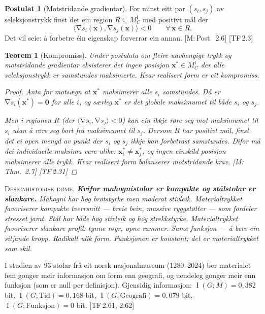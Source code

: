 \documentclass[10pt]{book}
\theoremstyle{definition}
\newtheorem{postulat}[definisjon]{Postulat}
\theoremstyle{plain}
\newtheorem{teorem}[definisjon]{Teorem}
\theoremstyle{remark}
\newenvironment{designhistorie}%
  {\medskip\noindent\textsc{Designhistorisk d\o me.}\itshape\enspace}%
  {\medskip}
\newcommand{\MC}{M^{\mathsf{I}}_C}
\newcommand{\inner}[2]{\langle #1, #2 \rangle}
\DeclareMathOperator{\grad}{\nabla}
\DeclareMathOperator{\MI}{I}
\newcommand{\TF}[1]{\textnormal{[TF\,#1]}}
\newcommand{\Mref}[1]{\textnormal{[M:\,#1]}}
\begin{document}
\begin{postulat}[Motstridande gradientar]\label{post:motstr}
For minst eitt par $(s_i, s_j)$ av seleksjonstrykk finst det ein region $R \subseteq \MC$ med positivt m\aa l der
\[
  \inner{\grad s_i(\bm{x})}{\grad s_j(\bm{x})} < 0 \qquad \forall\, \bm{x} \in R.
\]
Det vil seie: \aa{} forbetre \' ein eigenskap forverrar ein annan. \Mref{Post.~2.6} \TF{2.3}
\end{postulat}

\begin{teorem}[Kompromiss]\label{thm:kompromiss}
Under postulata om fleire uavhengige trykk og motstridande gradientar eksisterer det ingen posisjon $\bm{x}^* \in \MC$ der alle seleksjonstrykk er samstundes maksimerte. Kvar realisert form er eit \emph{kompromiss}.

\begin{proof}
Anta for mots\ae gn at $\bm{x}^*$ maksimerer alle $s_i$ samstundes. D\aa{} er $\grad s_i(\bm{x}^*) = \bm{0}$ for alle $i$, og s\ae rleg $\bm{x}^*$ er det globale maksimumet til b\aa de $s_i$ og $s_j$.

Men i regionen $R$ (der $\inner{\grad s_i}{\grad s_j} < 0$) kan ein ikkje r\o re seg mot maksimumet til $s_i$ utan \aa{} r\o re seg bort fr\aa{} maksimumet til $s_j$. Dersom $R$ har positivt m\aa l, finst det ei open mengd av punkt der $s_i$ og $s_j$ ikkje kan forbetrast samstundes. Difor m\aa{} dei individuelle maksima vere ulike: $\bm{x}_i^* \neq \bm{x}_j^*$, og ingen einskild posisjon maksimerer alle trykk. Kvar realisert form balanserer motstridande krav. \Mref{Thm.~2.7} \TF{2.31}
\end{proof}
\end{teorem}

\begin{designhistorie}
\textbf{Kvifor mahognistolar er kompakte og st\aa lstolar er slankare.} Mahogni har h\o g br\o tstyrke men moderat stivleik. Materialtrykket favoriserer kompakte tverrsnitt --- breie bein, massive ryggst\o tter --- som fordeler stresset jamt. St\aa l har b\aa de h\o g stivleik og h\o g strekkstyrke. Materialtrykket favoriserer slankare profil: tynne r\o yr, opne rammer. Same funksjon --- \aa{} bere ein sitjande kropp. Radikalt ulik form. Funksjonen er konstant; det er materialtrykket som skil.

I studien av 93 stolar fr\aa{} eit norsk nasjonalmuseum (1280--2024) ber materialet fem gonger meir informasjon om form enn geografi, og uendeleg gonger meir enn funksjon (som er null per definisjon). Gjensidig informasjon: $\MI(G; M) = 0{,}382$ bit, $\MI(G; \mathrm{Tid}) = 0{,}168$ bit, $\MI(G; \mathrm{Geografi}) = 0{,}079$ bit, $\MI(G; \mathrm{Funksjon}) = 0$ bit. \TF{2.61, 2.62}
\end{designhistorie}
\end{document}

